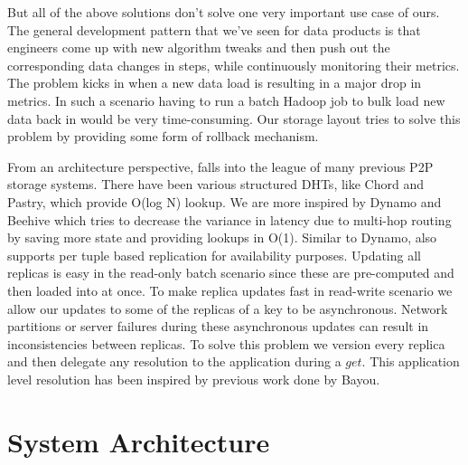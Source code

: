 \documentclass[10pt,twocolumn,preprint,natbib,authoryear]{sigplanconf}
\begin{document}
But all of the above solutions don't solve one very important use case of ours. The general development pattern that we've seen for data products is that engineers come up with new algorithm tweaks and then push out the corresponding data changes in steps, while continuously monitoring their metrics. The problem kicks in when a new data load is resulting in a major drop in metrics. In such a scenario having to run a batch Hadoop job to bulk load new data back in would be very time-consuming. Our storage layout tries to solve this problem by providing some form of rollback mechanism. 
 
From an architecture perspective, \projectname{} falls into the league of many previous P2P storage systems. There have been various structured DHTs, like Chord\cite{chord} and Pastry\cite{pastry}, which provide O(log N) lookup. We are more inspired by Dynamo and Beehive\cite{beehive} which tries to decrease the variance in latency due to multi-hop routing by saving more state and providing lookups in O(1). Similar to Dynamo, \projectname{} also supports per tuple based replication for availability purposes. Updating all replicas is easy in the read-only batch scenario since these are pre-computed and then loaded into \projectname{} at once. To make replica updates fast in read-write scenario we allow our updates to some of the replicas of a key to be asynchronous. Network partitions or server failures during these asynchronous updates can result in inconsistencies between replicas. To solve this problem we version every replica and then delegate any resolution to the application during a $get$. This application level resolution has been inspired by previous work done by Bayou\cite{bayou}. 


\section{System Architecture}
\label{sec:system_architecture}
\end{document}
